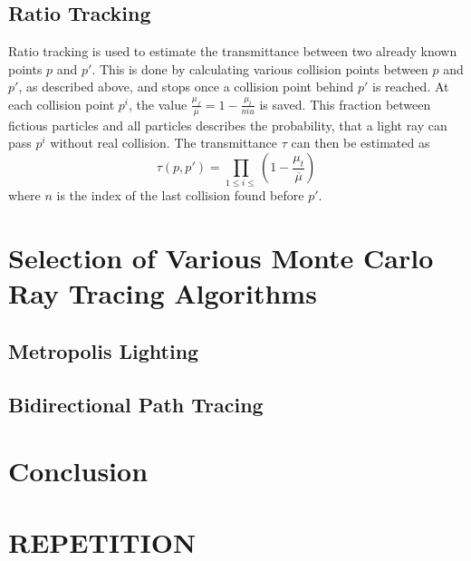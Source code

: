 \subsection{Ratio Tracking}
Ratio tracking is used to estimate the transmittance between two already known points $p$ and $p'$. This is done by calculating various collision points between $p$ and $p'$, as described above, and stops once a collision point behind $p'$ is reached. At each collision point $p^i$, the value $\frac{\mu_f}{\overline{\mu}} = 1 - \frac{\mu_t}{\overline{mu}}$ is saved. This fraction between fictious particles and all particles describes the probability, that a light ray can pass $p^i$ without real collision. The transmittance $\tau$ can then be estimated as 
\begin{equation}
\tau(p,p') = \prod_{1 \le i \le}(1 - \frac{\mu_t}{\overline{\mu}})
\end{equation}
where $n$ is the index of the last collision found before $p'$.
\section{Selection of Various Monte Carlo Ray Tracing Algorithms}
\subsection{Metropolis Lighting}
\subsection{Bidirectional Path Tracing}
\section{Conclusion}
\section{REPETITION}
